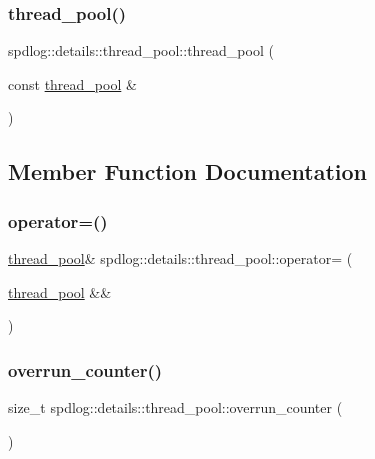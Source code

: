 \subsubsection{\texorpdfstring{thread\+\_\+pool()}{thread\_pool()}\hspace{0.1cm}{\footnotesize\ttfamily [2/2]}}
{\footnotesize\ttfamily spdlog\+::details\+::thread\+\_\+pool\+::thread\+\_\+pool (\begin{DoxyParamCaption}\item[{const \hyperlink{classspdlog_1_1details_1_1thread__pool}{thread\+\_\+pool} \&}]{ }\end{DoxyParamCaption})\hspace{0.3cm}{\ttfamily [delete]}}



\subsection{Member Function Documentation}
\mbox{\label{classspdlog_1_1details_1_1thread__pool_a1a62f3ab1474d69cd1e25143664e856d}} 
\subsubsection{\texorpdfstring{operator=()}{operator=()}}
{\footnotesize\ttfamily \hyperlink{classspdlog_1_1details_1_1thread__pool}{thread\+\_\+pool}\& spdlog\+::details\+::thread\+\_\+pool\+::operator= (\begin{DoxyParamCaption}\item[{\hyperlink{classspdlog_1_1details_1_1thread__pool}{thread\+\_\+pool} \&\&}]{ }\end{DoxyParamCaption})\hspace{0.3cm}{\ttfamily [delete]}}

\mbox{\label{classspdlog_1_1details_1_1thread__pool_adc34920f65797d8f54986dc1894a8804}} 
\subsubsection{\texorpdfstring{overrun\+\_\+counter()}{overrun\_counter()}}
{\footnotesize\ttfamily size\+\_\+t spdlog\+::details\+::thread\+\_\+pool\+::overrun\+\_\+counter (\begin{DoxyParamCaption}{ }\end{DoxyParamCaption})\hspace{0.3cm}{\ttfamily [inline]}}



